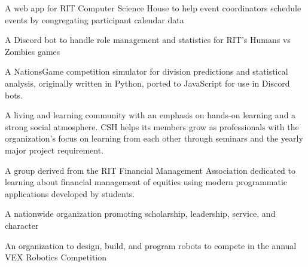 \documentclass[10pt,a4paper,ragged2e,withhyper]{altacv}
\begin{document}
\begin{paracol}{2}


A web app for RIT Computer Science House to help event coordinators schedule events by congregating participant calendar data\\

\divider

A Discord bot to handle role management and statistics for RIT's Humans vs  Zombies games\\


\divider

A NationsGame competition simulator for division predictions and statistical analysis, originally written in Python, ported to JavaScript for use in Discord bots.\\


\medskip


A living and learning community with an emphasis on hands-on learning and a strong social atmosphere. CSH helps its members grow as professionals with the organization's focus on learning from each other through seminars and the yearly major project requirement.

\divider

A group derived from the RIT Financial Management Association dedicated to learning about financial management of equities using modern programmatic applications developed by students.

\divider

A nationwide organization promoting scholarship, leadership, service, and character

\divider

An organization to design, build, and program robots to compete in the
annual VEX Robotics Competition
\switchcolumn


\end{paracol}
\end{document}

